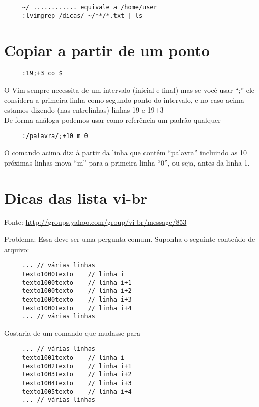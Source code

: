 \begin{verbatim}
     ~/ ............ equivale a /home/user
     :lvimgrep /dicas/ ~/**/*.txt | ls
\end{verbatim}


\section{Copiar a partir de um ponto}

\begin{verbatim}
     :19;+3 co $
\end{verbatim}

O Vim sempre necessita de um intervalo (inicial e final) mas se você
usar ``;'' ele considera a primeira linha como segundo ponto do
intervalo, e no caso acima estamos dizendo (nas entrelinhas) linhas
19 e 19+3     \\


De forma análoga podemos usar como referência um padrão qualquer

\begin{verbatim}
     :/palavra/;+10 m 0
\end{verbatim}

O comando acima diz: à partir da linha que contém ``palavra'' incluindo as 10 próximas linhas
mova ``m'' para a primeira linha ``0'', ou seja, antes da linha 1.

\section{Dicas das lista vi-br}

 Fonte: \url{http://groups.yahoo.com/group/vi-br/message/853}

 Problema:
 Essa deve ser uma pergunta comum.
 Suponha o seguinte conteúdo de arquivo:

\begin{verbatim}
     ... // várias linhas
     texto1000texto    // linha i
     texto1000texto    // linha i+1
     texto1000texto    // linha i+2
     texto1000texto    // linha i+3
     texto1000texto    // linha i+4
     ... // várias linhas
\end{verbatim}

Gostaria de um comando que mudasse para

\begin{verbatim}
     ... // várias linhas
     texto1001texto    // linha i
     texto1002texto    // linha i+1
     texto1003texto    // linha i+2
     texto1004texto    // linha i+3
     texto1005texto    // linha i+4
     ... // várias linhas
\end{verbatim}

